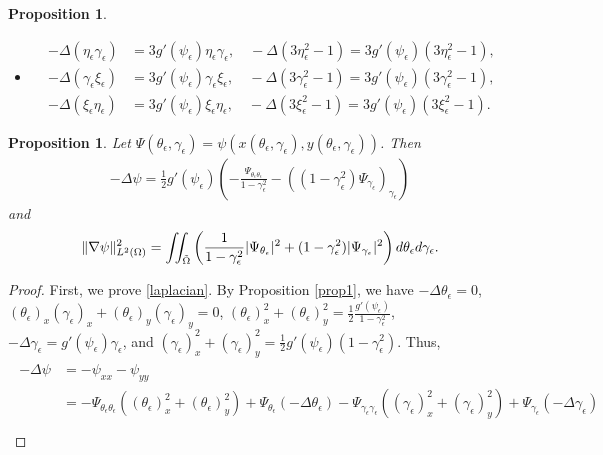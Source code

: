 \documentclass[1 [leqno, 11pt]{amsart}
\numberwithin{equation}{section}
\let\ep=\epsilon
\newtheorem{proposition}[Theorem]{Proposition}
\begin{document}
\begin{CJK*}{GBK}{song}
\begin{proposition}
\begin{itemize}
\item
\begin{align*}
-\Delta (\eta_\ep\gamma_\ep) &=  3g'(\psi_\epsilon) \eta_\ep\gamma_\ep, \quad -\Delta (3\eta_\ep^2-1) = 3g'(\psi_\epsilon) (3\eta_\ep^2 - 1), \\
-\Delta (\gamma_\ep \xi_\ep) &= 3g'(\psi_\epsilon) \gamma_\ep \xi_\ep, \quad -\Delta (3\gamma_\ep^2-1) = 3g'(\psi_\epsilon) (3\gamma_\ep^2 - 1), \\
-\Delta (\xi_\ep \eta_\ep) & =   3g'(\psi_\epsilon) \xi_\ep\eta_\ep,  \quad -\Delta (3\xi_\ep^2-1) = 3g'(\psi_\epsilon) (3\xi_\ep^2 - 1).
\end{align*}

\end{itemize}
\end{proposition}

\begin{proposition}\label{prop3} Let $\Psi(\theta_\ep, \gamma_\ep) = \psi(x(\theta_\ep, \gamma_\ep),y(\theta_\ep, \gamma_\ep))$. Then
\begin{align}\label{laplacian}-\Delta \psi = \frac 1 2 g'(\psi_\ep) \left( -\frac{\Psi_{\theta_\ep \theta_\ep}}{1-\gamma_\ep^2} - \left( (1-\gamma_\ep^2)\Psi_{\gamma_\ep} \right)_{\gamma_\ep} \right)\end{align}
and
\begin{align}\label{gradient-psi}\| \nabla \psi\|_{L^2(\Omega)}^2=\iint_{\tilde \Omega}\left({1\over1-\gamma_\ep^2}|\Psi_{\theta_\ep}|^2+(1-\gamma_\ep^2)|\Psi_{\gamma_\ep}|^2\right)d \theta_\ep d\gamma_\ep.\end{align}
\end{proposition}
\begin{proof} First, we prove \eqref{laplacian}.
By Proposition \ref{prop1}, we have
$-\Delta \theta_\ep = 0$, $(\theta_\ep)_x(\gamma_\ep)_x + (\theta_\ep)_y(\gamma_\ep)_y=0$, $(\theta_\ep)_x^2 + (\theta_\ep)_y^2 =\frac 1 2 \frac{ g'(\psi_\epsilon)}{1-\gamma_\ep^2}$,
$-\Delta \gamma_\ep = g'(\psi_\epsilon)\gamma_\ep$, and $(\gamma_\ep)_x^2 + (\gamma_\ep)_y^2  = \frac 1 2 g'(\psi_\epsilon)(1-\gamma_\ep^2).$ Thus,
\begin{align*}
\begin{split}
- \Delta \psi & = - \psi_{xx} - \psi_{yy} \\
&= -\Psi_{\theta_\ep \theta_\ep}((\theta_\ep)_x^2 + (\theta_\ep)_y^2) + \Psi_{\theta_\ep}(-\Delta \theta_\ep) - \Psi_{\gamma_\ep \gamma_\ep}\left((\gamma_\ep)_x^2 + (\gamma_\ep)_y^2 \right) + \Psi_{\gamma_\ep}(-\Delta \gamma_\ep) \\

\end{split}
\end{align*}
\end{proof}
\end{CJK*}
\end{document}
